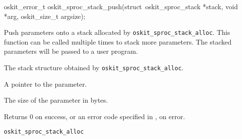 \begin{apisyn}

        \funcproto oskit_error_t   oskit_sproc_stack_push(struct~oskit_sproc_stack *stack,
                                       void *arg, oskit_size_t argsize);
\end{apisyn}
\begin{apidesc}
        Push parameters onto a stack allocated by
        \texttt{oskit_sproc_stack_alloc}.  This function
        can be called multiple times to stack more parameters.
        The stacked parameters will be passed to a user program.
\end{apidesc}
\begin{apiparm}
        \item[stack]
                The stack structure obtained by \texttt{oskit_sproc_stack_alloc}.

        \item[arg]
                A pointer to the parameter.

        \item[argsize]
                The size of the parameter in bytes.

\end{apiparm}
\begin{apiret}
        Returns 0 on success, or an error code specified in
        , on error.
\end{apiret}
\begin{apirel}
        {\tt oskit_sproc_stack_alloc}
\end{apirel}


